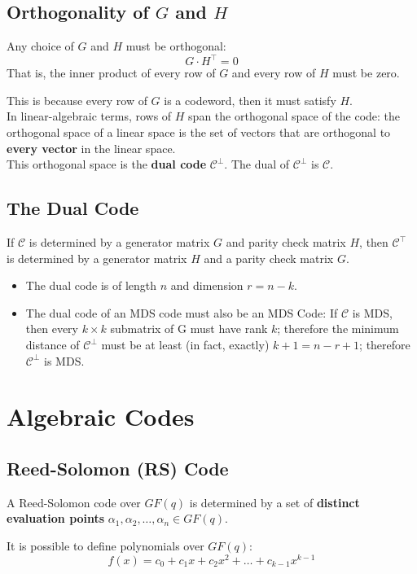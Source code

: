 \documentclass[11pt]{article}
\begin{document}
\subsection{Orthogonality of $G$ and $H$}
Any choice of $G$ and $H$ must be orthogonal:
\[
  G \cdot H^\intercal = 0
\]
That is, the inner product of every row of $G$ and every row of $H$ must be zero.

This is because every row of $G$ is a codeword, then it must satisfy $H$. \\

In linear-algebraic terms, rows of $H$ span the orthogonal space of the code: the orthogonal space of a linear space is the set of vectors that are orthogonal to \textbf{every vector} in the linear space. \\

This orthogonal space is the \textbf{dual code} $\mathcal{C}^\bot$.
The dual of $\mathcal{C}^\bot$ is $\mathcal{C}$.

\subsection{The Dual Code}
If $\mathcal{C}$ is determined by a generator matrix $G$ and parity check matrix $H$, then $\mathcal{C}^\intercal$ is determined by a generator matrix $H$ and a parity check matrix $G$.

\begin{itemize}
  \item The dual code is of length $n$ and dimension $r = n - k$.
  \item The dual code of an MDS code must also be an MDS Code:
    If $\mathcal{C}$ is MDS, then every $k \times k$ submatrix of G must have rank $k$; therefore the minimum distance of $\mathcal{C}^\bot$ must be at least (in fact, exactly) $k + 1 = n - r + 1$; therefore $\mathcal{C}^\bot$ is MDS.
\end{itemize}

\section{Algebraic Codes}
\subsection{Reed-Solomon (RS) Code}
A Reed-Solomon code over $GF(q)$ is determined by a set of \textbf{distinct evaluation points} $\alpha_1, \alpha_2, \ldots, \alpha_n \in GF(q)$.

It is possible to define polynomials over $GF(q)$:
\[
  f(x) = c_0 + c_1x + c_2x^2 + \ldots + c_{k - 1}x^{k - 1}
\]
\end{document}
